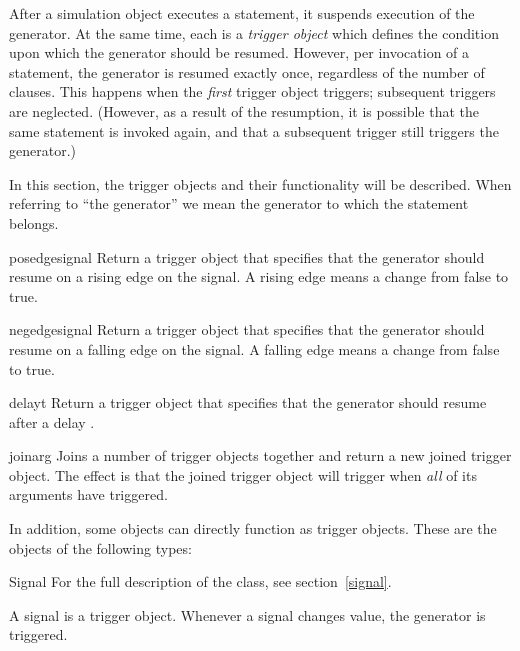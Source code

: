  

After a simulation object executes a  statement, it
suspends execution of the generator. At the same time, each
 is a \emph{trigger object} which defines the condition
upon which the generator should be resumed. However, per invocation of a
 statement, the generator is resumed exactly once,
regardless of the number of clauses. This happens when the
\emph{first} trigger object triggers; subsequent triggers are
neglected. (However, as a result of the resumption, it is possible
that the same  statement is invoked again, and that a
subsequent trigger still triggers the generator.)

In this section, the trigger objects and their functionality will be
described. When referring to ``the generator'' we mean the generator
to which the  statement belongs.

\begin{funcdesc}{posedge}{signal}
Return a trigger object that specifies that the generator should
resume on a rising edge on the signal. A rising edge means a change
from false to true.
\end{funcdesc}

\begin{funcdesc}{negedge}{signal}
Return a trigger object that specifies that the generator should
resume on a falling edge on the signal. A falling edge means a change
from false to true.
\end{funcdesc}

\begin{funcdesc}{delay}{t}
Return a trigger object that specifies that the generator should
resume after a delay .
\end{funcdesc}

\begin{funcdesc}{join}{arg }
Joins a number of trigger objects together and return a new joined
trigger object.  The effect is that the joined trigger object will
trigger when \emph{all} of its arguments have triggered.
\end{funcdesc}

In addition, some objects can directly function as trigger
objects. These are the objects of the following types:

\begin{datadesc}{Signal}
For the full description of the  class, see
section~\ref{signal}.

A signal is a trigger object. Whenever a signal changes value, the
generator is triggered.
\end{datadesc}

